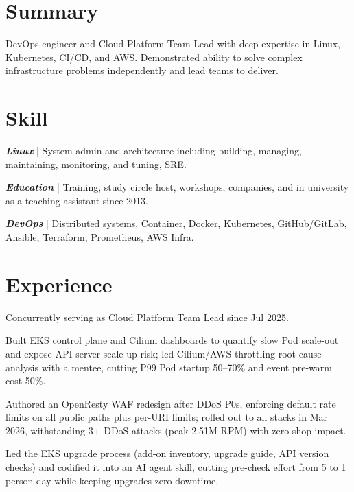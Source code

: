 \documentclass[]{deedy-resume-openfont}
\begin{document}
\begin{minipage}[t]{1\textwidth}



\section{Summary}
\begin{summary}
    DevOps engineer and Cloud Platform Team Lead with deep expertise in Linux, Kubernetes, \mbox{CI/CD}, and AWS. Demonstrated ability to solve complex infrastructure problems independently and lead teams to deliver.
\end{summary}

\section{Skill}
\vspace{\topsep}
\begin{tightemize}
    \item \textbf{\emph{Linux}} | System admin and architecture including building, managing, maintaining, monitoring, and tuning, SRE.
    \item \textbf{\emph{Education}} | Training, study circle host, workshops, companies, and in university as a teaching assistant since 2013.
    \item \textbf{\emph{DevOps}} | Distributed systems, Container, Docker, Kubernetes, GitHub/GitLab, Ansible, Terraform, Prometheus, AWS Infra.
\end{tightemize}


\section{Experience}


\null\hfill{}
\begin{tightemize}
    \item Concurrently serving as Cloud Platform Team Lead since Jul 2025.
    \item Built EKS control plane and Cilium dashboards to quantify slow Pod scale-out and expose API server scale-up risk; led Cilium/AWS throttling root-cause analysis with a mentee, cutting P99 Pod startup 50--70\% and event pre-warm cost 50\%.
    \item Authored an OpenResty WAF redesign after DDoS P0s, enforcing default rate limits on all public paths plus per-URI limits; rolled out to all stacks in Mar 2026, withstanding 3+ DDoS attacks (peak 2.51M RPM) with zero shop impact.
    \item Led the EKS upgrade process (add-on inventory, upgrade guide, API version checks) and codified it into an AI agent skill, cutting pre-check effort from 5 to 1 person-day while keeping upgrades zero-downtime.
\end{tightemize}
\sectionsep


\end{minipage}
\end{document}
